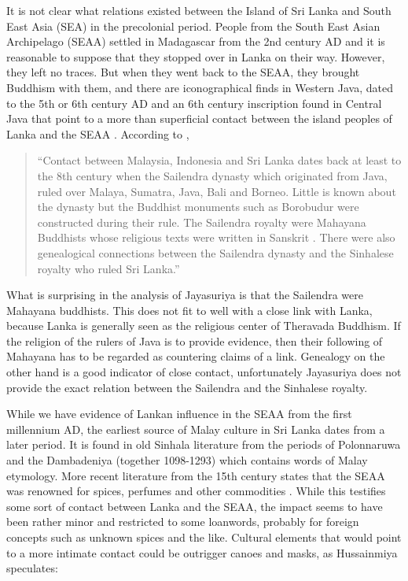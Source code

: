 It is not clear what relations existed between the Island of Sri Lanka and South East Asia (SEA) in the precolonial period. People from the South East Asian Archipelago (SEAA) settled in Madagascar from the 2nd century AD and it is reasonable to suppose that they stopped over in Lanka on their way. However, they left no traces. But when they went back to the SEAA, they brought Buddhism with them, and there are iconographical finds in Western Java, dated to the 5th or 6th century AD \citet{Dupont1959} \citep{abc}  and an 6th century inscription found in Central Java \citep{Decasparis1961} \citep{abc}  that point to a more than superficial contact between the island peoples of Lanka and the SEAA \citep[5]{Bichsel}.
According to  \citet[11]{Jayasuriya2002},

\begin{quotation}
    ``Contact between Malaysia, Indonesia and Sri Lanka dates back at least to the 8th century when the Sailendra dynasty which originated from Java, ruled over Malaya, Sumatra, Java, Bali and Borneo. Little is known about the dynasty but the Buddhist monuments such as Borobudur were constructed during their rule. The Sailendra royalty were Mahayana Buddhists whose religious texts were written in Sanskrit \el . There were also genealogical connections between the Sailendra dynasty and the Sinhalese royalty who ruled Sri Lanka.''\citep[11]{Jayasuriya2002}
\end{quotation}

What is surprising in the analysis of Jayasuriya is that the Sailendra were Mahayana buddhists. This does not fit to well with a close link with Lanka, because Lanka is generally seen as the religious center of Theravada Buddhism. If the religion of the rulers of Java is to provide evidence, then their following of Mahayana has to be regarded as countering claims of a link. Genealogy on the other hand is a good indicator of close contact, unfortunately Jayasuriya does not provide  the exact relation between the Sailendra and the Sinhalese royalty.

While we have evidence of Lankan influence in the SEAA from the
first millennium AD, the earliest source of Malay culture in Sri
Lanka dates from a later period. It is found in old Sinhala
literature from the periods of Polonnaruwa and the Dambadeniya
(together 1098-1293) which contains words of Malay etymology. More
recent literature from the 15th century states that the SEAA was
renowned for spices, perfumes and other commodities
\citep[11]{Jayasuriya2002}. While this testifies some sort of
contact between Lanka and the SEAA, the impact seems to have been
rather minor and restricted to some loanwords, probably for
foreign concepts such as unknown spices and the like. Cultural
elements that would point to a more intimate contact could be
outrigger canoes and masks, as Hussainmiya speculates:

